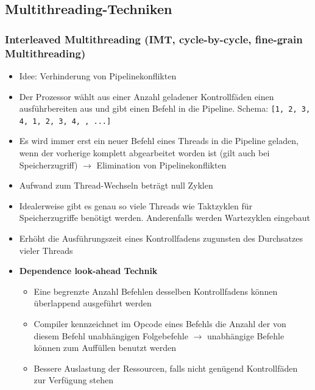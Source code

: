 \subsection{Multithreading-Techniken}

\subsubsection{Interleaved Multithreading (IMT, cycle-by-cycle, fine-grain Multithreading)}
\begin{itemize}
	\item Idee: Verhinderung von Pipelinekonflikten
	\item Der Prozessor wählt aus einer Anzahl geladener Kontrollfäden einen ausführbereiten aus und gibt einen Befehl in die Pipeline. Schema: \texttt{[1, 2, 3, 4, 1, 2, 3, 4, , ...]}
	\item Es wird immer erst ein neuer Befehl eines Threads in die Pipeline geladen, wenn der vorherige komplett abgearbeitet worden ist (gilt auch bei Speicherzugriff) \(\rightarrow\) Elimination von Pipelinekonflikten
	\item Aufwand zum Thread-Wechseln beträgt null Zyklen
	\item Idealerweise gibt es genau so viele Threads wie Taktzyklen für Speicherzugriffe benötigt werden. Anderenfalls werden Wartezyklen eingebaut
	\item Erhöht die Ausführungszeit eines Kontrollfadens zugunsten des Durchsatzes vieler Threads
	\item \textbf{Dependence look-ahead Technik}
	\begin{itemize}
		\item Eine begrenzte Anzahl Befehlen desselben Kontrollfadens können überlappend ausgeführt werden
		\item Compiler kennzeichnet im Opcode eines Befehls die Anzahl der von diesem Befehl unabhängigen Folgebefehle \(\rightarrow\) unabhängige Befehle können zum Auffüllen benutzt werden
		\item Bessere Auslastung der Ressourcen, falls nicht genügend Kontrollfäden zur Verfügung stehen
	\end{itemize}
\end{itemize}

